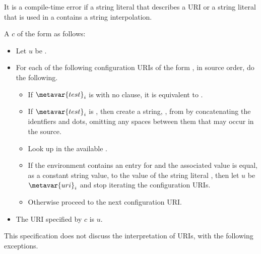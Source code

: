 \documentclass[makeidx]{article}
\begin{document}
{\LMHash{}%
It is a compile-time error if a string literal that describes a URI
or a string literal that is used in a 
contains a string interpolation.

\LMHash{}%
A  $c$ of the form
 as follows:

\begin{itemize}
\item
  Let $u$ be .
\item
  For each of the following configuration URIs of the form
  ,
  in source order, do the following.

  \begin{itemize}
  \item
    If $\metavar{test}_i$ is 
    with no \lit{==} clause, it is
    equivalent to .
  \item
    If $\metavar{test}_i$ is ,
    then create a string, , from 
    by concatenating the identfiers and dots,
    omitting any spaces between them that may occur in the source.
  \item
    Look up  in the available
    .
  \item
    If the environment contains an entry for  and the
    associated value is equal, as a constant string value, to the value of
    the string literal ,
    then let $u$ be $\metavar{uri}_i$ and stop iterating the configuration URIs.
  \item
    Otherwise proceed to the next configuration URI.
  \end{itemize}
\item
  The URI specified by $c$ is $u$.
\end{itemize}

\LMHash{}%
This specification does not discuss the interpretation of URIs,
with the following exceptions.

}
\end{document}
